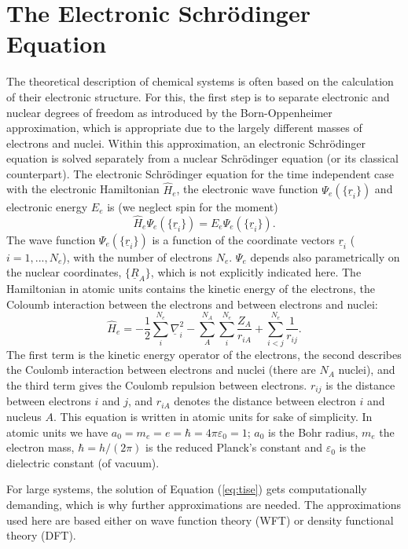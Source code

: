 \documentclass[11pt,DIV=13,BCOR=5mm,a4paper,headinclude]{scrbook}
\renewcommand{\vec}[1]{\underline{#1}}
\begin{document}
\section{The Electronic Schr\"{o}dinger Equation}
The theoretical description of chemical systems is often based on the calculation of their electronic structure.
For this, the first step is to separate electronic and nuclear degrees of freedom as introduced by the Born-Oppenheimer approximation\cite{bornoppenheimer}, which is appropriate due to the largely different masses of electrons and nuclei.
Within this approximation, an electronic Schrödinger equation is solved separately from a nuclear Schrödinger equation (or its classical counterpart).
The electronic Schrödinger equation for the time independent case  with the electronic Hamiltonian $\hat{H}_e$, the electronic wave function $\Psi_e(\{\vec{r}_i\})$ and electronic energy $E_e$ is (we neglect spin for the moment)
\begin{equation}\label{eq:tise}
 \hat{H}_e\Psi_e(\{\vec{r}_i\})=E_e\Psi_e(\{\vec{r}_i\}).
\end{equation}
The wave function $\Psi_e(\{\vec{r}_i\})$ is a function of the coordinate vectors $\vec{r}_i$ ($i=1,...,N_e$), with the number of electrons $N_e$.
$\Psi_e$ depends also parametrically on the nuclear coordinates, $\{\vec{R}_A\}$, which is not explicitly indicated here.
The Hamiltonian in atomic units contains the kinetic energy of the electrons, the Coloumb interaction between the electrons and between electrons and nuclei:
\begin{equation}
 \hat{H}_e= -\frac{1}{2}\sum_i^{N_e}\vec{\nabla}_i^2 - \sum_A^{N_A}\sum_i^{N_e}\frac{Z_A}{r_{iA}} + \sum_{i<j}^{N_e}\frac{1}{r_{ij}}.
\end{equation}
The first term is the kinetic energy operator of the electrons, the second describes the Coulomb interaction between electrons and nuclei (there are $N_A$ nuclei), and the third term gives the Coulomb repulsion between electrons.
$r_{ij}$ is the distance between electrons $i$ and $j$, and $r_{iA}$ denotes the distance between electron $i$ and nucleus $A$.
This equation is written in atomic units for sake of simplicity.
In atomic units we have $a_0=m_e=e=\hbar=4\pi\varepsilon_0=1$; $a_0$ is the Bohr radius, $m_e$ the electron mass, $\hbar=h/(2\pi)$ is the reduced Planck's constant and $\varepsilon_0$ is the dielectric constant (of vacuum).

For large systems, %
the solution of Equation (\ref{eq:tise}) gets computationally demanding, which is why further approximations are needed.
The approximations used here are based either on wave function theory (WFT) or density functional theory (DFT).
\end{document}
